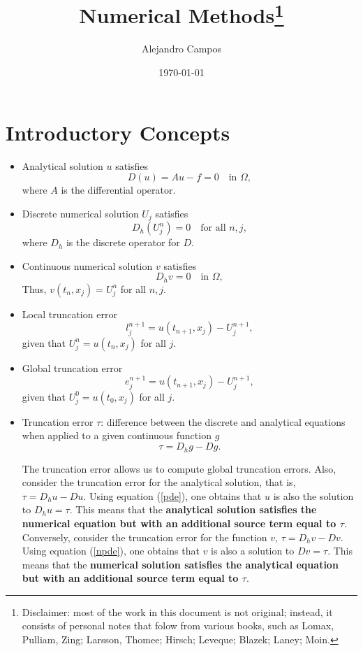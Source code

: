 \documentclass[oneside,a4paper,11pt]{report}
\title{Numerical Methods\thanks{Disclaimer: most of the work in this document is not original; instead, it consists of personal notes that folow from various books, such as Lomax, Pulliam, Zing; Larsson, Thomee; Hirsch; Leveque; Blazek; Laney; Moin.}}
\date{\today}
\author{Alejandro Campos}
\begin{document}
\maketitle
\tableofcontents

\part{Introductory Concepts}
\begin{itemize}
\item Analytical solution $u$ satisfies
\begin{equation}
D(u) = Au - f = 0\quad \text{in } \Omega,
\label{pde}
\end{equation}
where $A$ is the differential operator.

\item Discrete numerical solution $U_j$ satisfies 
\begin{equation}
D_h(U^n_j) = 0 \quad \text{for all } n, j ,
\end{equation}
where $D_h$ is the discrete operator for $D$.

\item Continuous numerical solution $v$ satisfies
\begin{equation}
D_hv = 0 \quad \text{in } \Omega,
\label{npde}
\end{equation}
Thus, $v(t_n, x_j) = U^n_j$ for all $n, j$.

\item Local truncation error 
\begin{equation}
l^{n+1}_j = u(t_{n+1}, x_j) - U^{n+1}_j,
\end{equation}
given that $U^n_j = u(t_n, x_j)$ for all $j$. 

\item Global truncation error
\begin{equation}
e^{n+1}_j = u(t_{n+1}, x_j) - U^{n+1}_j,
\end{equation}
given that $U^0_j = u(t_0, x_j)$ for all $j$.

\item Truncation error $\tau$: difference between the discrete and analytical equations when applied to a given continuous function $g$
\begin{equation}
\tau = D_hg - Dg.
\label{trunc}
\end{equation}

The truncation error allows us to compute global truncation errors. Also, consider the truncation error for the analytical solution, that is, $\tau = D_hu - Du$. Using equation (\ref{pde}), one obtains that $u$ is also the solution to $D_hu = \tau$. This means that the \textbf{analytical solution satisfies the numerical equation but with an additional source term equal to $\tau$}. Conversely, consider the truncation error for the function $v$, $\tau = D_hv - Dv$. Using equation (\ref{npde}), one obtains that $v$ is also a solution to $Dv = \tau$. This means that the \textbf{numerical solution satisfies the analytical equation but with an additional source term equal to $\tau$}.


\end{itemize}
\end{document}

